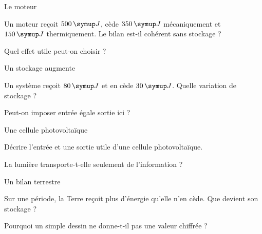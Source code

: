 \par\noindent\begin{minipage}{\linewidth}
\begin{exercice}[2]{Le moteur}
\begin{questions}
\item Un moteur reçoit $500\unite J$, cède $350\unite J$ mécaniquement et $150\unite J$ thermiquement. Le bilan est-il cohérent sans stockage ?
\item Quel effet utile peut-on choisir ?
\end{questions}
\end{exercice}
\end{minipage}
\par\noindent\begin{minipage}{\linewidth}
\begin{exercice}[2]{Un stockage augmente}
\begin{questions}
\item Un système reçoit $80\unite J$ et en cède $30\unite J$. Quelle variation de stockage ?
\item Peut-on imposer entrée égale sortie ici ?
\end{questions}
\end{exercice}
\end{minipage}
\par\noindent\begin{minipage}{\linewidth}
\begin{exercice}[2]{Une cellule photovoltaïque}
\begin{questions}
\item Décrire l’entrée et une sortie utile d’une cellule photovoltaïque.
\item La lumière transporte-t-elle seulement de l’information ?
\end{questions}
\end{exercice}
\end{minipage}
\par\noindent\begin{minipage}{\linewidth}
\begin{exercice}[2]{Un bilan terrestre}
\begin{questions}
\item Sur une période, la Terre reçoit plus d’énergie qu’elle n’en cède. Que devient son stockage ?
\item Pourquoi un simple dessin ne donne-t-il pas une valeur chiffrée ?
\end{questions}
\end{exercice}
\end{minipage}
